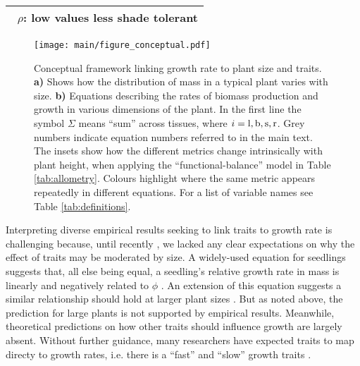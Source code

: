 \documentclass[9pt,twocolumn,twoside]{pnas-new}
\begin{document}
\begin{table}[!ht]
\begin{tabular}{p{8cm}}
 $\,$ $\rho$: low values less shade tolerant \citep{Osunkoya-1996}\\
  \bottomrule
\end{tabular}
\label{tab:phenomena}
\end{table}


\begin{figure}[!hb]
\centering
\texttt{[image: main/figure\_conceptual.pdf]}
\caption{Conceptual framework linking growth rate to plant size and traits.
\textbf{a)} Shows how the distribution of mass in a typical plant varies with size.
\textbf{b)} Equations describing the rates of biomass production and growth in various dimensions of the plant. In the first line the symbol $\Sigma$ means ``sum'' across tissues, where $i = {\rm l,b,s,r}$. Grey numbers indicate equation numbers referred to in the main text. The insets show how the different metrics change intrinsically with plant height, when applying the ``functional-balance'' model in Table \ref{tab:allometry}. Colours highlight where the same metric appears repeatedly in different equations. For a list of variable names see Table \ref{tab:definitions}.}
\label{fig:conceptual}
\end{figure}

Interpreting diverse empirical results seeking to link traits to growth rate is challenging because, until recently \citep{Gibert-2016}, we lacked any clear expectations on why the effect of traits may be moderated by size. A widely-used equation for seedlings suggests that, all else being equal, a seedling's relative growth rate in mass is linearly and negatively related to $\phi$ \citep{Lambers-1992, Cornelissen-1996, Wright-2000}. An extension of this equation suggests a similar relationship should hold at larger plant sizes \citep{Enquist-2007}. But as noted above, the prediction for large plants is not supported by empirical results. Meanwhile, theoretical predictions on how other traits should influence growth are largely absent. Without further guidance, many researchers have expected traits to map directy to growth rates, i.e. there is a ``fast'' and ``slow'' growth traits \citep[e.g.][]{Grime-1977, Poorter-2008, Chave-2009, Paine-2015}.
\end{document}

